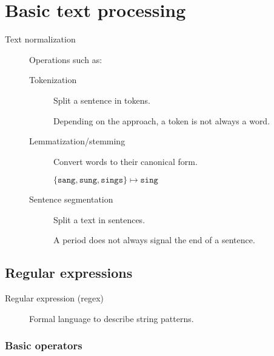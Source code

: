 \chapter{Basic text processing}


\begin{description}
    \item[Text normalization]
        Operations such as:
        \begin{description}
            \item[Tokenization] 
            Split a sentence in tokens.

            \begin{remark}
                Depending on the approach, a token is not always a word.
            \end{remark}

            \item[Lemmatization/stemming] 
                Convert words to their canonical form.

                \begin{example}
                    $\{ \texttt{sang}, \texttt{sung}, \texttt{sings} \} \mapsto \texttt{sing}$
                \end{example}

            \item[Sentence segmentation] 
                Split a text in sentences.

                \begin{remark}
                    A period does not always signal the end of a sentence.
                \end{remark}
        \end{description}
\end{description}


\section{Regular expressions}

\begin{description}
    \item[Regular expression (regex)] 
        Formal language to describe string patterns.
\end{description}


\subsection{Basic operators}


